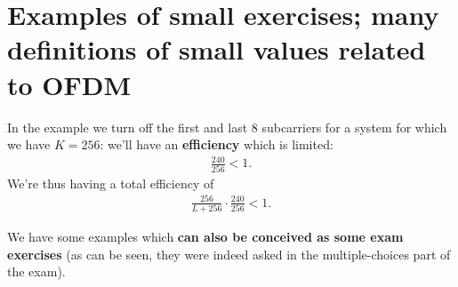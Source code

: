 \documentclass[a4paper, 12pt]{book}
\begin{document}
\section[Examples of small exercises]{Examples of small exercises; many definitions of small values related to OFDM}

In the example we turn off the first and last 8 subcarriers for a system for which we have $K=256$: we'll have an \textbf{efficiency} which is limited:
\begin{align*}
    \frac{240}{256} < 1.
\end{align*}
We're thus having a total efficiency of
\begin{align*}
    \frac{256}{L+256} \cdot \frac{240}{256} < 1.
\end{align*}

We have some examples which \textbf{can also be conceived as some exam exercises} (as can be seen, they were indeed asked in the multiple-choices part of the exam).
\end{document}

